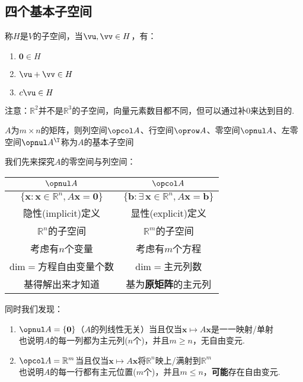 \subsection{四个基本子空间}
\begin{definition}[子空间]
称$H$是$V$的子空间，当$\vu,\vv\in H$，有：
\begin{enumerate}
	\item $\mathbf{0}\in H$
	\item $\vu+\vv\in H$
	\item $c\vu\in H$
\end{enumerate}
注意：$\mathbb{R}^2$并不是$\mathbb{R}^3$的子空间，向量元素数目都不同，但可以通过补$0$来达到目的.
\end{definition}
\begin{definition}[基本子空间]
$A$为$m\times n$的矩阵，则列空间$\opcol A$、行空间$\oprow A$、零空间$\opnul A$、左零空间$\opnul A^\T$称为$A$的基本子空间
\end{definition}
\label{nul_and_col}
我们先来探究$A$的零空间与列空间：
\renewcommand\arraystretch{1.2}
\begin{table}[!htbp]%
\begin{center}
\begin{tabular}{|c|c|}
\hline
$\opnul A$ & $\opcol A$ \\ \hline
$\{\mathbf{x}:\mathbf{x}\in\mathbb{R}^n,A\mathbf{x}=\mathbf{0}\}$ & $\{\mathbf{b}:\exists\,\mathbf{x}\in\mathbb{R}^n,A\mathbf{x}=\mathbf{b}\}$\\ \hline
隐性(implicit)定义 & 显性(explicit)定义 \\ \hline
$\mathbb{R}^n$的子空间 & $\mathbb{R}^m$的子空间\\ \hline
考虑有$n$个变量 & 考虑有$m$个方程\\ \hline
$\mathrm{dim}=$方程自由变量个数 & $\mathrm{dim}=$主元列数 \\ \hline
基得解出来才知道 & 基为\textbf{原矩阵}的主元列\\
\hline
\end{tabular}
\end{center}
\end{table}
\renewcommand\arraystretch{1}
\par 同时我们发现：
\begin{enumerate}
	\item $\opnul  A=\{\mathbf{0}\}$（$A$的列线性无关）当且仅当$\mathbf{x}\mapsto A\mathbf{x}$是一一映射/单射\\
		也说明$A$的每一列都为主元列($n$个)，并且$m\geq n$，无自由变元.
	\item $\opcol A=\mathbb{R}^m$当且仅当$\mathbf{x}\mapsto A\mathbf{x}$将$\mathbb{R}^n$映上/满射到$\mathbb{R}^m$\\
		也说明$A$的每一行都有主元位置($m$个)，并且$m\leq n$，\textbf{可能}存在自由变元.
\end{enumerate}
